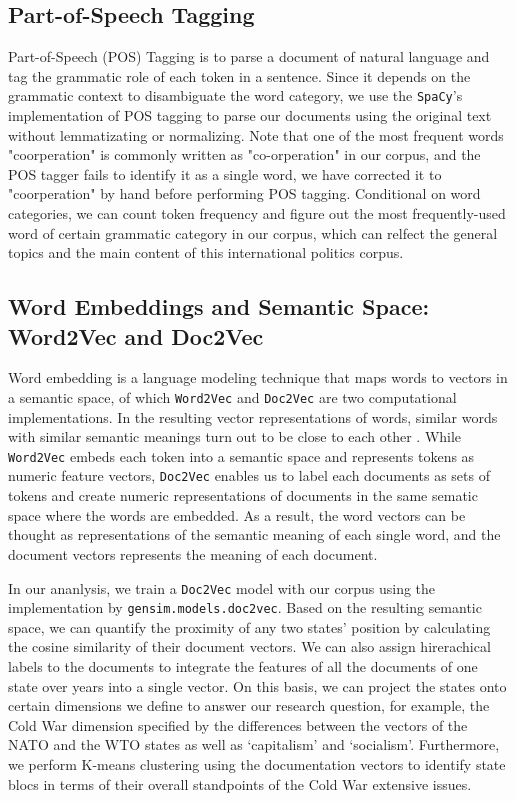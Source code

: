 \documentclass[final,authoryear,3p,12pt,times,hidelinks]{elsarticle}
\begin{document}
\subsection{Part-of-Speech Tagging}
\label{subsec:Part of Speech}
Part-of-Speech (POS) Tagging is to parse a document of natural language and tag the grammatic role of each token in a sentence. Since it depends on the grammatic context to disambiguate the word category, we use the \texttt{SpaCy}'s implementation of POS tagging to parse our documents using the original text without lemmatizating or normalizing. Note that one of the most frequent words "coorperation" is commonly written as "co-orperation" in our corpus, and the POS tagger fails to identify it as a single word, we have corrected it to "coorperation" by hand before performing POS tagging. Conditional on word categories, we can count token frequency and figure out the most frequently-used word of certain grammatic category in our corpus, which can relfect the general topics and the main content of this international politics corpus. 

\subsection{Word Embeddings and Semantic Space: Word2Vec and Doc2Vec}
\label{subsec:Word Embeddings}
Word embedding is a language modeling technique that maps words to vectors in a semantic space, of which \texttt{Word2Vec} and \texttt{Doc2Vec} are two computational implementations. In the resulting vector representations of words, similar words with similar semantic meanings turn out to be close to each other \citep{mikolov2013efficient}. While \texttt{Word2Vec} embeds each token into a semantic space and represents tokens as numeric feature vectors, \texttt{Doc2Vec} enables us to label each documents as sets of tokens and create numeric representations of documents in the same sematic space where the words are embedded. As a result, the word vectors can be thought as representations of the semantic meaning of each single word, and the document vectors represents the meaning of each document. 

In our ananlysis, we train a \texttt{Doc2Vec} model with our corpus using the implementation by \texttt{gensim.models.doc2vec}. Based on the resulting semantic space, we can quantify the proximity of any two states' position by calculating the cosine similarity of their document vectors. We can also assign hirerachical labels to the documents to integrate the features of all the documents of one state over years into a single vector. On this basis, we can project the states onto certain dimensions we define to answer our research question, for example, the Cold War dimension specified by the differences between the vectors of the NATO and the WTO states as well as `capitalism' and `socialism'. Furthermore, we perform K-means clustering using the documentation vectors to identify state blocs in terms of their overall standpoints of the Cold War extensive issues. 
\end{document}
